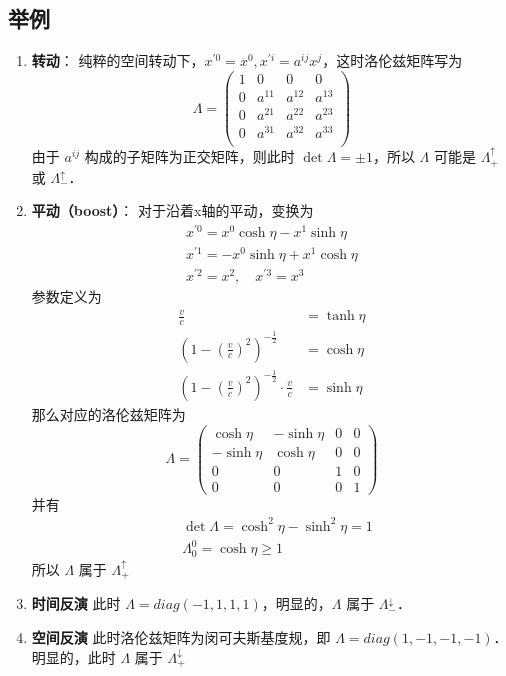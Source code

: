 \subsection{举例}
\begin{enumerate}
\item \textbf{转动}： 纯粹的空间转动下，$x^{\prime 0}=x^{0}, x^{\prime i}=a^{i j} x^{j}$，这时洛伦兹矩阵写为
\begin{equation}       %
\Lambda=\left(                 %
  \begin{array}{cccc}   %
   1& 0 & 0 & 0\\  %
   0& a^{11} &  a^{12} &  a^{13}\\  %
   0& a^{21} &  a^{22} &  a^{23}\\  %
   0& a^{31} &  a^{32} &  a^{33}\\  %
  \end{array}
\right)                 %
\end{equation}
由于 $a^{ij}$ 构成的子矩阵为正交矩阵，则此时 $\det\Lambda=\pm1$，所以 $\Lambda$ 可能是 $\Lambda_{+}^{\uparrow}$ 或 $\Lambda_{-}^{\uparrow}$．
\item \textbf{平动（boost）}： 对于沿着x轴的平动，变换为
\begin{equation}\begin{array}{c}
x^{\prime 0}=x^{0} \cosh \eta-x^{1} \sinh \eta \\
x^{\prime 1}=-x^{0} \sinh \eta+x^{1} \cosh \eta \\
x^{\prime 2}=x^{2}, \quad x^{\prime 3}=x^{3}
\end{array}\end{equation}
参数定义为
\begin{align}
 \frac{v}{c} &=\tanh\eta \\
\left(1-(\frac{v}{c})^2 \right)^{-\frac{1}{2}} &=\cosh\eta\\
\left   (1-(\frac{v}{c})^2 \right)^{-\frac{1}{2}}\cdot\frac{v}{c}&=\sinh\eta 
\end{align}
那么对应的洛伦兹矩阵为
\begin{equation}\Lambda=\left(\begin{array}{cccc}
\cosh \eta & -\sinh \eta & 0 & 0 \\
-\sinh \eta & \cosh \eta & 0 & 0 \\
0 & 0 & 1 & 0 \\
0 & 0 & 0 & 1
\end{array}\right)\end{equation}
并有
\begin{equation}\begin{aligned}
&\det\Lambda=\cosh ^{2} \eta-\sinh ^{2} \eta=1\\
&\Lambda_{0}^{0}=\cosh \eta \geqslant 1
\end{aligned}\end{equation}
所以 $\Lambda$ 属于 $\Lambda_{+}^{\uparrow}$
\item \textbf{时间反演}
此时 $\Lambda=diag(-1,1,1,1)$，明显的，$\Lambda$ 属于 $\Lambda_{-}^{\downarrow}$．
\item \textbf{空间反演}
此时洛伦兹矩阵为闵可夫斯基度规，即 $\Lambda=diag(1,-1,-1,-1)$．明显的，此时 $\Lambda$ 属于 $\Lambda_{+}^{\downarrow}$
\end{enumerate}
